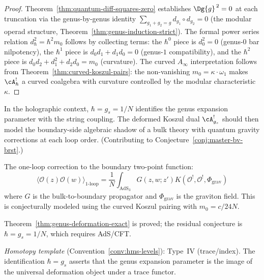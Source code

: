 \begin{proof}
Theorem~\ref{thm:quantum-diff-squares-zero} establishes
$\Dg{g}^{\,2} = 0$ at each truncation via the genus-by-genus
identity $\sum_{g_1+g_2=g} d_{g_1} \circ d_{g_2} = 0$
(the modular operad structure,
Theorem~\ref{thm:genus-induction-strict}).  The formal
power series relation $d_\hbar^2 = \hbar^2 m_0$ follows
by collecting terms: the $\hbar^0$ piece is $d_0^2 = 0$
(genus-$0$ bar nilpotency), the $\hbar^1$ piece is
$d_0 d_1 + d_1 d_0 = 0$ (genus-$1$ compatibility), and
the $\hbar^2$ piece is
$d_0 d_2 + d_1^2 + d_2 d_0 = m_0$ (curvature).  The
curved $A_\infty$ interpretation follows from
Theorem~\ref{thm:curved-koszul-pairs}: the
non-vanishing $m_0 = \kappa \cdot \omega_1$ makes
$\cA^!_\hbar$ a curved coalgebra with curvature
controlled by the modular characteristic~$\kappa$.
\end{proof}

\begin{conjecture}
\label{conj:loop-string-coupling}
In the holographic context, $\hbar = g_s = 1/N$
identifies the genus expansion parameter with the string
coupling.  The deformed Koszul dual
$\cA^!_{g_s}$ should then model the boundary-side algebraic shadow of a
bulk theory with quantum gravity corrections at each loop order.
(Contributing to Conjecture~\ref{conj:master-bv-brst}.)
\end{conjecture}

\begin{example}
The one-loop correction to the boundary two-point
function:
\[
\langle \mathcal{O}(z) \mathcal{O}(w)
\rangle_{1\text{-loop}} = \frac{1}{N}
\int_{\mathrm{AdS}_3} G(z,w;z')
K(\mathcal{O}^!, \mathcal{O}^!, \Phi_{\mathrm{grav}})
\]
where $G$ is the bulk-to-boundary propagator and
$\Phi_{\mathrm{grav}}$ is the graviton field.  This is
conjecturally modeled using the curved Koszul pairing with
$m_0 = c/24N$.
\end{example}

\begin{remark}[Scope]
Theorem~\ref{thm:genus-deformation-exact} is proved; the residual conjecture is
$\hbar = g_s = 1/N$, which requires AdS/CFT.

\emph{Homotopy template} (Convention~\ref{conv:hms-levels}): Type~IV
(trace/index).  The identification $\hbar = g_s$ asserts that the
genus expansion parameter is the image of the universal deformation
object under a trace functor.
\end{remark}

